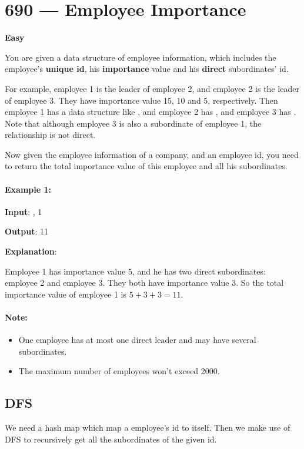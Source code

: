 \section{690 --- Employee Importance}

\textbf{Easy}

You are given a data structure of employee information, which includes the employee's \textbf{unique id}, his \textbf{importance} value and his \textbf{direct} subordinates' id.

For example, employee 1 is the leader of employee 2, and employee 2 is the leader of employee 3. They have importance value 15, 10 and 5, respectively. Then employee 1 has a data structure like \fcj{[1, 15, [2]]}, and employee 2 has \fcj{[2, 10, [3]]}, and employee 3 has \fcj{[3, 5, []]}. Note that although employee 3 is also a subordinate of employee 1, the relationship is not direct.

Now given the employee information of a company, and an employee id, you need to return the total importance value of this employee and all his subordinates.

\paragraph{Example 1:}

\begin{flushleft}
\textbf{Input}: \fcj{[[1, 5, [2, 3]], [2, 3, []], [3, 3, []]]}, 1

\textbf{Output}: 11

\textbf{Explanation}:

Employee 1 has importance value 5, and he has two direct subordinates: employee 2 and employee 3. They both have importance value 3. So the total importance value of employee 1 is $5 + 3 + 3 = 11$.
\end{flushleft}
 

\paragraph{Note:}

\begin{itemize}
\item One employee has at most one direct leader and may have several subordinates.

\item The maximum number of employees won't exceed 2000.
\end{itemize}

\subsection{DFS}
We need a hash map which map a employee's id to itself. Then we make use of DFS to recursively get all the subordinates of the given id.

